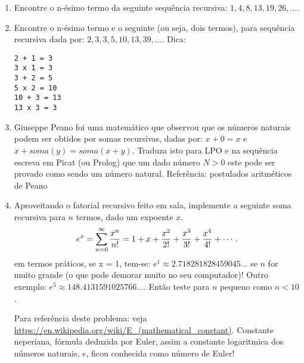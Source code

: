 \documentclass[a4paper,12pt]{article}
\begin{document}
\begin{enumerate}
\item Encontre o n-ésimo  termo da seguinte  sequência recursiva:  $1, 4, 8, 13, 19, 26,...$. 

\item Encontre o n-ésimo  termo e o seguinte (ou seja, dois termos), para  sequência recursiva dada por: $2, 3, 3, 5, 10, 13, 39,...$. Dica:
\begin{verbatim}
2 + 1 = 3
3 x 1 = 3
3 + 2 = 5
5 x 2 = 10
10 + 3 = 13
13 x 3 = 3
\end{verbatim}

\item  Giuseppe Peano foi uma matemático que observou que os números
naturais podem ser obtidos por  somas recursivas, dadas por:
$x + 0 = x$ e $x + soma(y) = soma(x + y)$. Traduza isto para 
LPO e na sequência escreva em Picat (ou Prolog) que um dado número $N>0$ este pode ser provado como sendo um número natural. Referência: postulados aritméticos de Peano

\item Aproveitando o fatorial recursivo feito em sala, implemente a seguinte soma recursiva para $n$ termos, dado um expoente  $x$.
  $$e^x = \sum^\infty_{n=0} {x^n\over n!} =1 + x + {x^2 \over 2!} + {x^3 \over 3!} + {x^4 \over 4!}+\cdots.$$
  em termos práticos, se x = 1, tem-se:
$e^1 \approx 2.718281828459045...$ se $n$ for muito grande (o que pode demorar muito no seu computador)! Outro exemplo:
$e^5 \approx 148.4131591025766...$. Então teste para $n$ pequeno como $n < 10$.

\vspace{0.7cm}
Para referência deste problema: veja \url{https://en.wikipedia.org/wiki/E_(mathematical_constant)}. Constante neperiana, fórmula deduzida por Euler, assim a constante logaritmica dos números naturais, $e$, ficou conhecida como número de Euler!

\end{enumerate}
\end{document}
